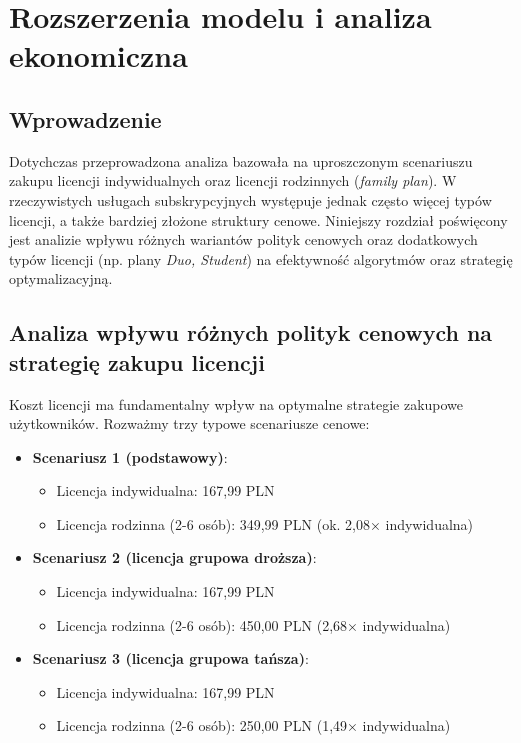 \chapter{Rozszerzenia modelu i analiza ekonomiczna}

\section{Wprowadzenie}

Dotychczas przeprowadzona analiza bazowała na uproszczonym scenariuszu zakupu licencji indywidualnych oraz licencji rodzinnych (\textit{family plan}). W rzeczywistych usługach subskrypcyjnych występuje jednak często więcej typów licencji, a także bardziej złożone struktury cenowe. Niniejszy rozdział poświęcony jest analizie wpływu różnych wariantów polityk cenowych oraz dodatkowych typów licencji (np. plany \textit{Duo, Student}) na efektywność algorytmów oraz strategię optymalizacyjną.

\section{Analiza wpływu różnych polityk cenowych na strategię zakupu licencji}

Koszt licencji ma fundamentalny wpływ na optymalne strategie zakupowe użytkowników. Rozważmy trzy typowe scenariusze cenowe:

\begin{itemize}
    \item \textbf{Scenariusz 1 (podstawowy)}:
    \begin{itemize}
        \item Licencja indywidualna: 167,99 PLN
        \item Licencja rodzinna (2-6 osób): 349,99 PLN (ok. 2,08× indywidualna)
    \end{itemize}

    \item \textbf{Scenariusz 2 (licencja grupowa droższa)}:
    \begin{itemize}
        \item Licencja indywidualna: 167,99 PLN
        \item Licencja rodzinna (2-6 osób): 450,00 PLN (2,68× indywidualna)
    \end{itemize}

    \item \textbf{Scenariusz 3 (licencja grupowa tańsza)}:
    \begin{itemize}
        \item Licencja indywidualna: 167,99 PLN
        \item Licencja rodzinna (2-6 osób): 250,00 PLN (1,49× indywidualna)
    \end{itemize}
\end{itemize}

